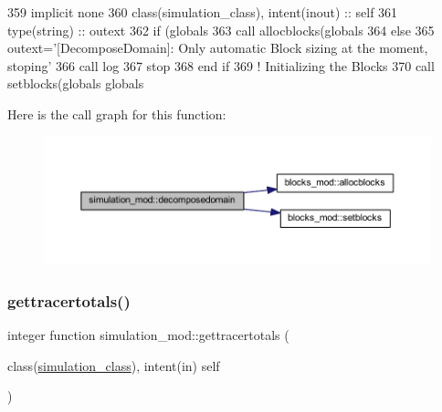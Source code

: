 \begin{DoxyCode}
359     \textcolor{keywordtype}{implicit none}
360     \textcolor{keywordtype}{class}(simulation\_class), \textcolor{keywordtype}{intent(inout)} :: self
361     \textcolor{keywordtype}{type}(string) :: outext
362     \textcolor{keywordflow}{if} (globals%
363         \textcolor{keyword}{call }allocblocks(globals%
364     \textcolor{keywordflow}{else}
365         outext=\textcolor{stringliteral}{'[DecomposeDomain]: Only automatic Block sizing at the moment, stoping'}
366         \textcolor{keyword}{call }log%
367         stop
368 \textcolor{keywordflow}{    end if}
369     \textcolor{comment}{! Initializing the Blocks}
370     \textcolor{keyword}{call }setblocks(globals%
      globals%
\end{DoxyCode}
Here is the call graph for this function\+:\nopagebreak
\begin{figure}[H]
\begin{center}
\leavevmode
\includegraphics[width=350pt]{namespacesimulation__mod_a2b8198a9fb3f7671c6b45192a0b9740c_cgraph}
\end{center}
\end{figure}
\mbox{\label{namespacesimulation__mod_a0ad485eab624ffa4df282f1da8d9f214}} 
\subsubsection{\texorpdfstring{gettracertotals()}{gettracertotals()}}
{\footnotesize\ttfamily integer function simulation\+\_\+mod\+::gettracertotals (\begin{DoxyParamCaption}\item[{class(\mbox{\hyperlink{structsimulation__mod_1_1simulation__class}{simulation\+\_\+class}}), intent(in)}]{self }\end{DoxyParamCaption})\hspace{0.3cm}{\ttfamily [private]}}



